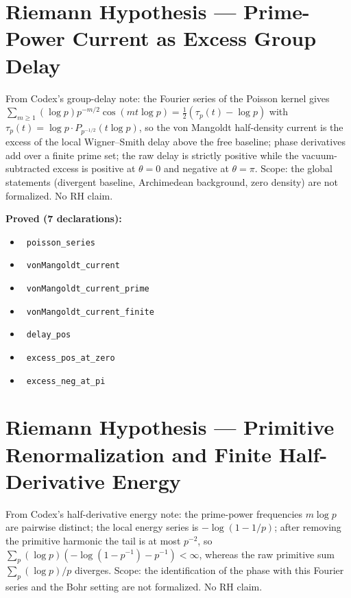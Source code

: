 \documentclass{report}
\theoremstyle{definition}
\begin{document}
\section{Riemann Hypothesis --- Prime-Power Current as Excess Group Delay}
From Codex's group-delay note: the Fourier series of the Poisson kernel gives $\sum_{m\ge1}(\log p)p^{-m/2}\cos(mt\log p)=\tfrac12(\tau_p(t)-\log p)$ with $\tau_p(t)=\log p\cdot P_{p^{-1/2}}(t\log p)$, so the von Mangoldt half-density current is the excess of the local Wigner--Smith delay above the free baseline; phase derivatives add over a finite prime set; the raw delay is strictly positive while the vacuum-subtracted excess is positive at $\theta=0$ and negative at $\theta=\pi$. Scope: the global statements (divergent baseline, Archimedean background, zero density) are not formalized. No RH claim.

\noindent\textbf{Proved (7 declarations):}
\begin{itemize}
  \item {}\leanok\ \texttt{poisson\_series}
  \item {}\leanok\ \texttt{vonMangoldt\_current}
  \item {}\leanok\ \texttt{vonMangoldt\_current\_prime}
  \item {}\leanok\ \texttt{vonMangoldt\_current\_finite}
  \item {}\leanok\ \texttt{delay\_pos}
  \item {}\leanok\ \texttt{excess\_pos\_at\_zero}
  \item {}\leanok\ \texttt{excess\_neg\_at\_pi}
\end{itemize}

\section{Riemann Hypothesis --- Primitive Renormalization and Finite Half-Derivative Energy}
From Codex's half-derivative energy note: the prime-power frequencies $m\log p$ are pairwise distinct; the local energy series is $-\log(1-1/p)$; after removing the primitive harmonic the tail is at most $p^{-2}$, so $\sum_p(\log p)(-\log(1-p^{-1})-p^{-1})<\infty$, whereas the raw primitive sum $\sum_p(\log p)/p$ diverges. Scope: the identification of the phase with this Fourier series and the Bohr setting are not formalized. No RH claim.
\end{document}
